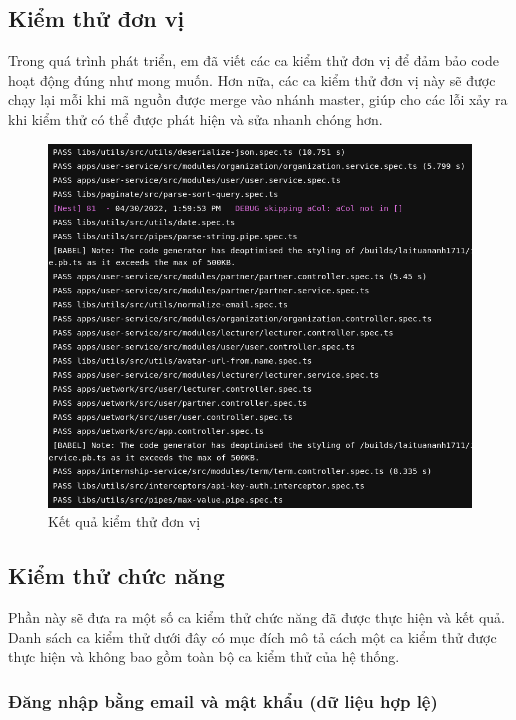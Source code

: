 \documentclass[./../main.tex]{subfiles}
\begin{document}
\subsection{Kiểm thử đơn vị}

Trong quá trình phát triển, em đã viết các ca kiểm thử đơn vị để đảm bảo code hoạt động đúng như mong muốn. Hơn nữa, các ca kiểm thử đơn vị này sẽ được chạy lại mỗi khi mã nguồn được merge vào nhánh master, giúp cho các lỗi xảy ra khi kiểm thử có thể được phát hiện và sửa nhanh chóng hơn.

\begin{figure}[H]
	\includegraphics[width=\linewidth]{./images/image14.png}
	\caption{Kết quả kiểm thử đơn vị}
	\label{fig:unit_test_result}
\end{figure}

\subsection{Kiểm thử chức năng}

Phần này sẽ đưa ra một số ca kiểm thử chức năng đã được thực hiện và kết quả. Danh sách ca kiểm thử dưới đây có mục đích mô tả cách một ca kiểm thử được thực hiện và không bao gồm toàn bộ ca kiểm thử của hệ thống.

\subsubsection{Đăng nhập bằng email và mật khẩu (dữ liệu hợp lệ)}
\end{document}
